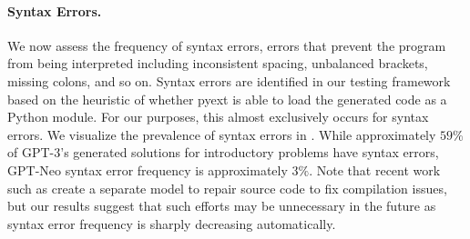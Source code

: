 \paragraph{Syntax Errors.} We now assess the frequency of syntax errors, errors that prevent the program from being interpreted including inconsistent spacing, unbalanced brackets, missing colons, and so on. Syntax errors are identified in our testing framework based on the heuristic of whether pyext is able to load the generated code as a Python module. For our purposes, this almost exclusively occurs for syntax errors. We visualize the prevalence of syntax errors in . While approximately $59\%$ of GPT-3's generated solutions for introductory problems have syntax errors, GPT-Neo syntax error frequency is approximately $3\%$. Note that recent work such as \cite{Yasunaga2020GraphbasedSP} create a separate model to repair source code to fix compilation issues, but our results suggest that such efforts may be unnecessary in the future as syntax error frequency is sharply decreasing automatically.


